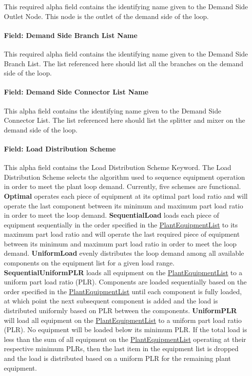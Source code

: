 This required alpha field contains the identifying name given to the Demand Side Outlet Node. This node is the outlet of the demand side of the loop.

\paragraph{Field: Demand Side Branch List Name}\label{field-demand-side-branch-list-name}

This required alpha field contains the identifying name given to the Demand Side Branch List. The list referenced here should list all the branches on the demand side of the loop.

\paragraph{Field: Demand Side Connector List Name}\label{field-demand-side-connector-list-name}

This alpha field contains the identifying name given to the Demand Side Connector List. The list referenced here should list the splitter and mixer on the demand side of the loop.

\paragraph{Field: Load Distribution Scheme}\label{field-load-distribution-scheme-000}

This alpha field contains the Load Distribution Scheme Keyword. The Load Distribution Scheme selects the algorithm used to sequence equipment operation in order to meet the plant loop demand. Currently, five schemes are functional. \textbf{Optimal} operates each piece of equipment at its optimal part load ratio and will operate the last component between its minimum and maximum part load ratio in order to meet the loop demand. \textbf{SequentialLoad} loads each piece of equipment sequentially in the order specified in the \hyperref[plantequipmentlist]{PlantEquipmentList} to its maximum part load ratio and will operate the last required piece of equipment between its minimum and maximum part load ratio in order to meet the loop demand. \textbf{UniformLoad} evenly distributes the loop demand among all available components on the equipment list for a given load range. \textbf{SequentialUniformPLR} loads all equipment on the \hyperref[plantequipmentlist]{PlantEquipmentList} to a uniform part load ratio (PLR). Components are loaded sequentially based on the order specified in the \hyperref[plantequipmentlist]{PlantEquipmentList} until each component is fully loaded, at which point the next subsequent component is added and the load is distributed uniformly based on PLR between the components. \textbf{UniformPLR} will load all equipment on the \hyperref[plantequipmentlist]{PlantEquipmentList} to a uniform part load ratio (PLR). No equipment will be loaded below its minimum PLR. If the total load is less than the sum of all equipment on the \hyperref[plantequipmentlist]{PlantEquipmentList} operating at their respective minimum PLRs, then the last item in the equipment list is dropped and the load is distributed based on a uniform PLR for the remaining plant equipment.

